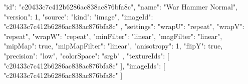 {
  "id": "c20433c7c412b6286ac838ac876bfa8c",
  "name": "War Hammer Normal",
  "version": 1,
  "source": {
    "kind": "image",
    "imageId": "c20433c7c412b6286ac838ac876bfa8c"
  },
  "settings": {
    "wrapU": "repeat",
    "wrapV": "repeat",
    "wrapW": "repeat",
    "minFilter": "linear",
    "magFilter": "linear",
    "mipMap": true,
    "mipMapFilter": "linear",
    "anisotropy": 1,
    "flipY": true,
    "precision": "low",
    "colorSpace": "srgb"
  },
  "textureIds": [
    "c20433c7c412b6286ac838ac876bfa8c"
  ],
  "imageIds": [
    "c20433c7c412b6286ac838ac876bfa8c"
  ]
}
